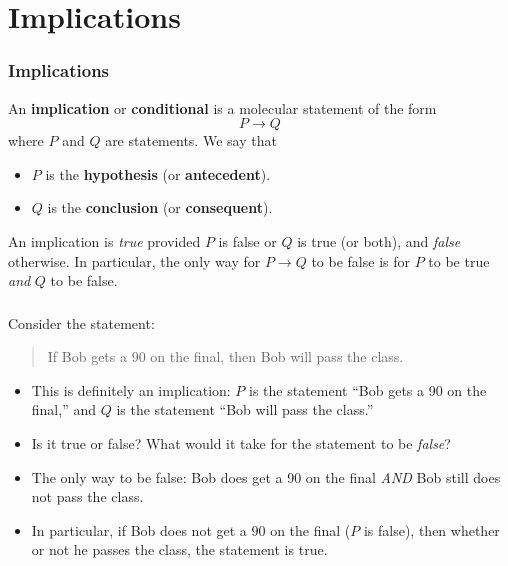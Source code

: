 \documentclass[11pt, compress]{beamer}
\newcommand{\terminology}[1]{\textbf{#1}}
\newcommand{\imp}{\rightarrow}
\begin{document}
\section{Implications}
\begin{frame}
\frametitle{Implications}
 An \terminology{implication} or \terminology{conditional} is a molecular statement of the form%
\begin{equation*}
P \imp Q
\end{equation*}
where \(P\) and \(Q\) are statements. We say that\begin{itemize}
\item{} \(P\) is the \terminology{hypothesis} (or \terminology{antecedent}).

\item{} \(Q\) is the \terminology{conclusion} (or \terminology{consequent}).
\end{itemize}

 An implication is \emph{true} provided \(P\) is false or \(Q\) is true (or both), and \emph{false} otherwise. In particular, the only way for \(P \imp Q\) to be false is for \(P\) to be true \emph{and} \(Q\) to be false.
\end{frame}
 
\begin{frame}
\frametitle{}
\begin{example}[0.2.2]Consider the statement:
\begin{quote}%
If Bob gets a 90 on the final, then Bob will pass the class.
\end{quote}

\pause 

\begin{itemize}[<+->]
\item{} This is definitely an implication: \(P\) is the statement ``Bob gets a 90 on the final,'' and \(Q\) is the statement ``Bob will pass the class.''


\item{} Is it true or false?  What would it take for the statement to be \emph{false}?


\item{} The only way to be false: Bob does get a 90 on the final \emph{AND} Bob still does not pass the class.


\item{} In particular, if Bob does not get a 90 on the final (\(P\) is false), then whether or not he passes the class, the statement is true.

\end{itemize}

\end{example}
\end{frame}
 
\end{document}
